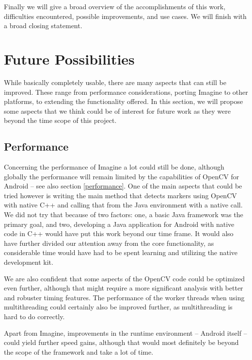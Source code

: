 \label{conclusion}

Finally we will give a broad overview of the accomplishments of this work, difficulties encountered, possible improvements, and use cases.
We will finish with a broad closing statement.

\section{Future Possibilities}
\label{future}

While basically completely usable, there are many aspects that can still be improved.
These range from performance considerations, porting Imagine to other platforms, to extending the functionality offered.
In this section, we will propose some aspects that we think could be of interest for future work as they were beyond the time scope of this project.

\subsection{Performance}

Concerning the performance of Imagine a lot could still be done, although globally the performance will remain limited by the capabilities of OpenCV for Android – see also section \ref{performance}.
One of the main aspects that could be tried however is writing the main method that detects markers using OpenCV with native C++ and calling that from the Java environment with a native call.
We did not try that because of two factors: one, a basic Java framework was the primary goal, and two, developing a Java application for Android with native code in C++ would have put this work beyond our time frame.
It would also have further divided our attention away from the core functionality, as considerable time would have had to be spent learning and utilizing the native development kit.

We are also confident that some aspects of the OpenCV code could be optimized even further, although that might require a more significant analysis with better and robuster timing features.
The performance of the worker threads when using multithreading could certainly also be improved further, as multithreading is hard to do correctly.

Apart from Imagine, improvements in the runtime environment – Android itself – could yield further speed gains, although that would most definitely be beyond the scope of the framework and take a lot of time.

